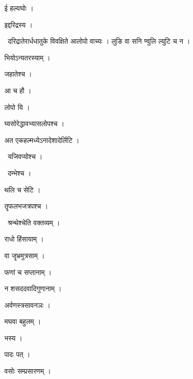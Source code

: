 \documentclass[10pt, openany, oneside]{book}
\begin{document}
\noindent ई हल्यघोः ।

\noindent इद्दरिद्रस्य ।

\par\noindent\hspace{1.5em}{\vps वा॰}~{\qt दरिद्रातेरार्धधातुके विवक्षिते आलोपो वाच्यः । लुङि वा सनि ण्वुलि ल्युटि च न ।}

\noindent भियोऽन्यतरस्याम् ।

\noindent जहातेश्च ।

\noindent आ च हौ ।

\noindent लोपो यि ।

\noindent घ्वसोरेद्धावभ्यासलोपश्च ।

\noindent अत एकहल्मध्येऽनादेशादेर्लिटि ।

\par\noindent\hspace{1.5em}{\vps वा॰}~{\qt यजिवप्योश्च ।}

\par\noindent\hspace{1.5em}{\vps वा॰}~{\qt दम्भेश्च ।}

\noindent थलि च सेटि ।

\noindent तॄफलभजत्रपश्च ।

\par\noindent\hspace{1.5em}{\vps वा॰}~{\qt श्रन्थेश्चेति वक्तव्यम् ।}

\noindent राधो हिंसायाम् ।

\noindent वा जॄभ्रमुत्रसाम् ।

\noindent फणां च सप्तानाम् ।

\noindent न शसददवादिगुणानाम् ।

\noindent अर्वणस्त्रसावनञः ।

\noindent मघवा बहुलम् ।

\noindent भस्य ।

\noindent पादः पत् ।

\noindent वसोः सम्प्रसारणम् ।
\end{document}
